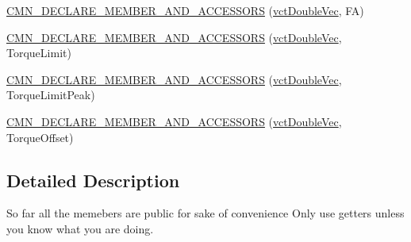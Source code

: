 {\bf }\par
\begin{DoxyCompactItemize}
\item 
\hyperlink{classprm_actuator_parameters_a7bb786869beec5b6b3b83619f3e3a4ff}{C\-M\-N\-\_\-\-D\-E\-C\-L\-A\-R\-E\-\_\-\-M\-E\-M\-B\-E\-R\-\_\-\-A\-N\-D\-\_\-\-A\-C\-C\-E\-S\-S\-O\-R\-S} (\hyperlink{vct_dynamic_vector_types_8h_ade4b3068c86fb88f41af2e5187e491c2}{vct\-Double\-Vec}, F\-A)
\end{DoxyCompactItemize}

{\bf }\par
\begin{DoxyCompactItemize}
\item 
\hyperlink{classprm_actuator_parameters_a81bd7bf30abc021dde0d2fbe0a6bf8cf}{C\-M\-N\-\_\-\-D\-E\-C\-L\-A\-R\-E\-\_\-\-M\-E\-M\-B\-E\-R\-\_\-\-A\-N\-D\-\_\-\-A\-C\-C\-E\-S\-S\-O\-R\-S} (\hyperlink{vct_dynamic_vector_types_8h_ade4b3068c86fb88f41af2e5187e491c2}{vct\-Double\-Vec}, Torque\-Limit)
\end{DoxyCompactItemize}

{\bf }\par
\begin{DoxyCompactItemize}
\item 
\hyperlink{classprm_actuator_parameters_a0c23510cef8dac14bebddd27e406e7bb}{C\-M\-N\-\_\-\-D\-E\-C\-L\-A\-R\-E\-\_\-\-M\-E\-M\-B\-E\-R\-\_\-\-A\-N\-D\-\_\-\-A\-C\-C\-E\-S\-S\-O\-R\-S} (\hyperlink{vct_dynamic_vector_types_8h_ade4b3068c86fb88f41af2e5187e491c2}{vct\-Double\-Vec}, Torque\-Limit\-Peak)
\end{DoxyCompactItemize}

{\bf }\par
\begin{DoxyCompactItemize}
\item 
\hyperlink{classprm_actuator_parameters_a1f6aafadb4aee573c63961711d51d9a8}{C\-M\-N\-\_\-\-D\-E\-C\-L\-A\-R\-E\-\_\-\-M\-E\-M\-B\-E\-R\-\_\-\-A\-N\-D\-\_\-\-A\-C\-C\-E\-S\-S\-O\-R\-S} (\hyperlink{vct_dynamic_vector_types_8h_ade4b3068c86fb88f41af2e5187e491c2}{vct\-Double\-Vec}, Torque\-Offset)
\end{DoxyCompactItemize}



\subsection{Detailed Description}
So far all the memebers are public for sake of convenience Only use getters unless you know what you are doing.

